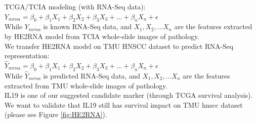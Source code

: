 \documentclass[12pt, a4paper]{article}
\begin{document}




TCGA/TCIA modeling (with RNA-Seq data):\\[0.2cm]
$Y_{mrna} = \beta_0 + \beta_1 X_1 + \beta_2 X_2 + \beta_3 X_3 + ... + \beta_n X_n + \epsilon$\\[0.3cm]
While 
$Y_{mrna}$ is known RNA-Seq data, and
$X_1, X_2, ...X_n$ are the features extracted by HE2RNA model from TCIA whole-slide images of pathology.\\[0.5cm]

We transfer HE2RNA model on TMU HNSCC dataset to predict RNA-Seq representation:\\[0.2cm]
$\hat{Y}_{mrna} = \beta_0 + \beta_1 X_1 + \beta_2 X_2 + \beta_3 X_3 + ... + \beta_n X_n + \epsilon$\\[0.3cm]
While $\hat{Y}_{mrna}$ is predicted RNA-Seq data, and
$X_1, X_2, ...X_n$ are the features extracted from TMU whole-slide images of pathology.\\
IL19 is one of our suggested candidate marker (through TCGA survival analysis).
We want to validate that IL19 still has survival impact on TMU \acrshort{hnscc} dataset (please see Figure \ref{fig:HE2RNA}).
\end{document}
